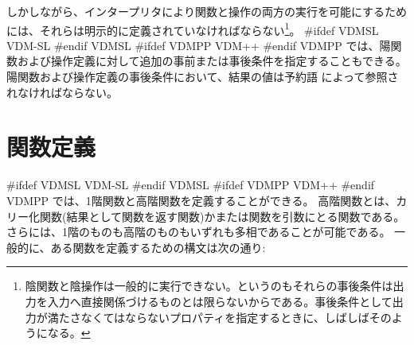 \documentclass[\pformat,12pt]{jarticle}
\newcommand{\vdmslpp}[2]{%
#ifdef VDMSL
#1
#endif VDMSL
#ifdef VDMPP
#2
#endif VDMPP
}
\newcommand{\vdmpp}{VDM++}
\begin{document}
しかしながら、インタープリタにより関数と操作の両方の実行を可能にするためには、それらは明示的に定義されていなければならない\footnote{陰関数と陰操作は一般的に実行できない。というのもそれらの事後条件は出力を入力へ直接関係づけるものとは限らないからである。事後条件として出力が満たさなくてはならないプロパティを指定するときに、しばしばそのようになる。}。
\vdmslpp{VDM-SL}{\vdmpp}では、陽関数および操作定義に対して追加の事前または事後条件を指定することもできる。
陽関数および操作定義の事後条件において、結果の値は予約語 によって参照されなければならない。
 
\section{関数定義}\label{functiondef}

\vdmslpp{VDM-SL}{\vdmpp}では、1階関数と高階関数を定義することができる。 
高階関数とは、カリー化関数(結果として関数を返す関数)かまたは関数を引数にとる関数である。
さらには、1階のものも高階のものもいずれも多相であることが可能である。
一般的に、ある関数を定義するための構文は次の通り:







\end{document}
